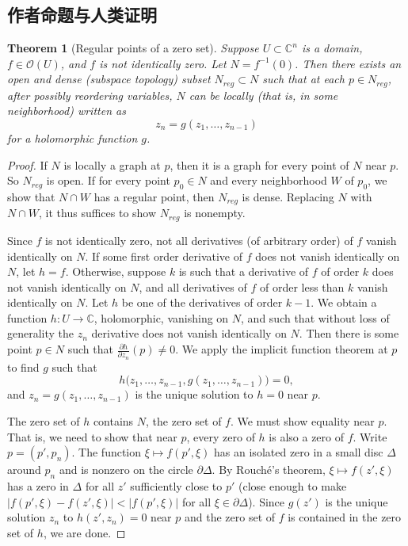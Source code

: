 \documentclass[UTF8,11pt]{ctexart}
\newtheorem*{theorem}{Theorem}
\theoremstyle{definition}
\newcommand{\C}{\mathbb C}
\newcommand{\sO}{\mathscr O}
\newcommand{\sabs}[1]{\lvert#1\rvert}
\begin{document}
\subsection*{作者命题与人类证明}
\begin{theorem}[Regular points of a zero set]\label{regptsdense}
Suppose $U\subset\C^n$ is a domain, $f\in\sO(U)$, and $f$ is not identically zero. Let $N=f^{-1}(0)$. Then there exists an open and dense (subspace topology) subset $N_{\mathit{reg}}\subset N$ such that at each $p\in N_{\mathit{reg}}$, after possibly reordering variables, $N$ can be locally (that is, in some neighborhood) written as
\[z_n=g(z_1,\ldots,z_{n-1})\]
for a holomorphic function $g$.
\end{theorem}
\begin{proof}
If $N$ is locally a graph at $p$, then it is a graph for every point of $N$ near $p$. So $N_{\mathit{reg}}$ is open. If for every point $p_0\in N$ and every neighborhood $W$ of $p_0$, we show that $N\cap W$ has a regular point, then $N_{\mathit{reg}}$ is dense. Replacing $N$ with $N\cap W$, it thus suffices to show $N_{\mathit{reg}}$ is nonempty.

Since $f$ is not identically zero, not all derivatives (of arbitrary order) of $f$ vanish identically on $N$. If some first order derivative of $f$ does not vanish identically on $N$, let $h=f$. Otherwise, suppose $k$ is such that a derivative of $f$ of order $k$ does not vanish identically on $N$, and all derivatives of $f$ of order less than $k$ vanish identically on $N$. Let $h$ be one of the derivatives of order $k-1$. We obtain a function $h\colon U\to\C$, holomorphic, vanishing on $N$, and such that without loss of generality the $z_n$ derivative does not vanish identically on $N$. Then there is some point $p\in N$ such that $\frac{\partial h}{\partial z_n}(p)\ne0$. We apply the implicit function theorem at $p$ to find $g$ such that
\[h\bigl(z_1,\ldots,z_{n-1},g(z_1,\ldots,z_{n-1})\bigr)=0,\]
and $z_n=g(z_1,\ldots,z_{n-1})$ is the unique solution to $h=0$ near $p$.

The zero set of $h$ contains $N$, the zero set of $f$. We must show equality near $p$. That is, we need to show that near $p$, every zero of $h$ is also a zero of $f$. Write $p=(p',p_n)$. The function $\xi\mapsto f(p',\xi)$ has an isolated zero in a small disc $\Delta$ around $p_n$ and is nonzero on the circle $\partial\Delta$. By Rouch\'e's theorem, $\xi\mapsto f(z',\xi)$ has a zero in $\Delta$ for all $z'$ sufficiently close to $p'$ (close enough to make $\sabs{f(p',\xi)-f(z',\xi)}<\sabs{f(p',\xi)}$ for all $\xi\in\partial\Delta$). Since $g(z')$ is the unique solution $z_n$ to $h(z',z_n)=0$ near $p$ and the zero set of $f$ is contained in the zero set of $h$, we are done.
\end{proof}
\end{document}
